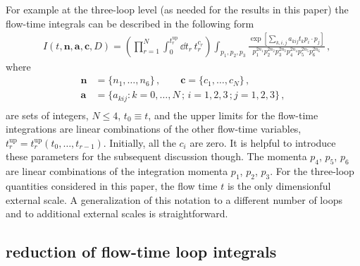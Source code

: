 For example at the three-loop level (as needed for the results in this paper)
the flow-time integrals can be described in the following form
\begin{equation}
\begin{split}
&I(t,\mathbf{n},\mathbf{a},\mathbf{c},D) =
  \left(\prod_{r=1}^N\int_0^{t_{r}^\text{up}}\dd
  t_r\,t_r^{c_r}\right)\int_{p_1,p_2,p_3} \frac{\exp[\sum_{k,i,j}
      a_{kij} t_k p_i \cdot p_j] }{p_1^{2n_1}p_2^{2n_2}p_3^{2n_3}
    p_4^{2n_4}p_5^{2n_5}p_6^{2n_6}}\,,
\label{eq:intrep}
\end{split}
\end{equation}
where
\begin{equation}
\begin{split}
\mathbf{n} &= \{n_1,\ldots,n_6\}\,,\qquad\mathbf{c} = \{c_1,\ldots,c_N\}\,,\\
\mathbf{a} &= \{a_{kij}:k=0,\ldots, N\,;\,i=1,2,3\,;j=1,2,3\}\,,\\
\end{split}
\end{equation}
are sets of integers, $N\leq 4$, $t_0\equiv t$, and the upper limits for
the flow-time integrations are linear combinations of the other
flow-time variables, $t_r^\text{up}=t_r^{\text{up}}(t_0,\ldots,
t_{r-1})$. Initially, all the $c_i$ are zero. It is helpful to introduce
these parameters for the subsequent discussion though.  The momenta
$p_4$, $p_5$, $p_6$ are linear combinations of the integration momenta
$p_1$, $p_2$, $p_3$.  For the three-loop quantities considered
in this paper, the flow time $t$ is the only dimensionful external scale.
A generalization of this notation to a different number of loops and to additional external
scales is straightforward.

\subsection{ reduction of flow-time loop integrals}\label{sec:reduction}


